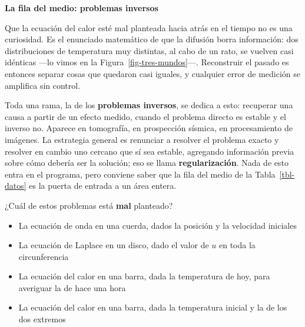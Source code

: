 \documentclass[
  spanish,
  a4paper,
]{scrbook}
\providecommand{\tightlist}{%
  \setlength{\itemsep}{0pt}\setlength{\parskip}{0pt}}
\theoremstyle{definition}
\theoremstyle{plain}
\theoremstyle{definition}
\theoremstyle{plain}
\theoremstyle{definition}
\theoremstyle{remark}
\begin{document}
\begin{tcolorbox}[enhanced jigsaw, arc=.35mm, bottomrule=.15mm, breakable, colback=white, colframe=quarto-callout-note-color-frame, left=2mm, leftrule=.75mm, opacityback=0, rightrule=.15mm, toprule=.15mm]
\begin{minipage}[t]{5.5mm}
\textcolor{quarto-callout-note-color}{\faInfo}
\end{minipage}%
\begin{minipage}[t]{\textwidth - 5.5mm}

\vspace{-3mm}\textbf{La fila del medio: problemas inversos}\vspace{3mm}

Que la ecuación del calor esté mal planteada hacia atrás en el tiempo no
es una curiosidad. Es el enunciado matemático de que la difusión borra
información: dos distribuciones de temperatura muy distintas, al cabo de
un rato, se vuelven casi idénticas ---lo vimos en la
Figura~\ref{fig-tres-mundos}---. Reconstruir el pasado es entonces
separar cosas que quedaron casi iguales, y cualquier error de medición
se amplifica sin control.

Toda una rama, la de los \textbf{problemas inversos}, se dedica a esto:
recuperar una causa a partir de un efecto medido, cuando el problema
directo es estable y el inverso no. Aparece en tomografía, en
prospección sísmica, en procesamiento de imágenes. La estrategia general
es renunciar a resolver el problema exacto y resolver en cambio uno
cercano que sí sea estable, agregando información previa sobre cómo
debería ser la solución; eso se llama \textbf{regularización}. Nada de
esto entra en el programa, pero conviene saber que la fila del medio de
la Tabla~\ref{tbl-datos} es la puerta de entrada a un área entera.

\end{minipage}%
\end{tcolorbox}

¿Cuál de estos problemas está \textbf{mal} planteado?

\begin{itemize}
\tightlist
\item
  {La ecuación de onda en una cuerda, dados la posición y la velocidad
  iniciales}
\item
  {La ecuación de Laplace en un disco, dado el valor de \(u\) en toda la
  circunferencia}
\item
  {La ecuación del calor en una barra, dada la temperatura de hoy, para
  averiguar la de hace una hora}
\item
  {La ecuación del calor en una barra, dada la temperatura inicial y la
  de los dos extremos}
\end{itemize}
\end{document}
